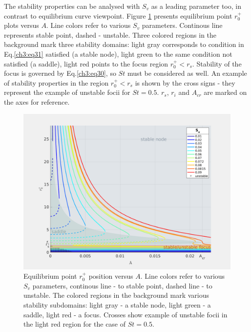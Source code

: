 \documentclass[../main.tex]{subfiles}
\begin{document}
The stability properties can be analysed with $S_v$ as a leading parameter too, in contrast to equilibrium curve viewpoint. Figure \ref{fig:ch3_8} presents equilibrium point $r^+_0$ plots versus $A$. Line colors refer to various $S_v$ parameters. Continous line represents stable point, dashed - unstable. Three colored regions in the background mark three stability domains: light gray corresponds to condition in Eq.\ref{ch3:eq31} satisfied (a stable node), light green to the same condition not satisfied (a saddle), light red points to the focus region $r^+_0<r_s$. Stability of the focus is governed by Eq.\ref{ch3:eq30}, so $St$ must be considered as well. An example of stability properties in the region $r^+_0<r_s$ is shown by the cross signs - they represent the example of unstable focii for $St=0.5$. $r_s$, $r_i$ and $A_{cr}$ are marked on the axes for reference.

\begin{figure}
\centering
\noindent \includegraphics[width=30pc]{gfx/r0_vs_A_plus_stability.png}
\caption{Equilibrium point $r^+_0$ position versus $A$. Line colors refer to various $S_v$ parameters, continous line - to stable point, dashed line - to unstable. The colored regions in the background mark various stability subdomains: light gray - a stable node, light green - a saddle, light red - a focus. Crosses show example of unstable focii in the light red region for the case of $St=0.5$.}
\label{fig:ch3_8}
\end{figure}
\end{document}
